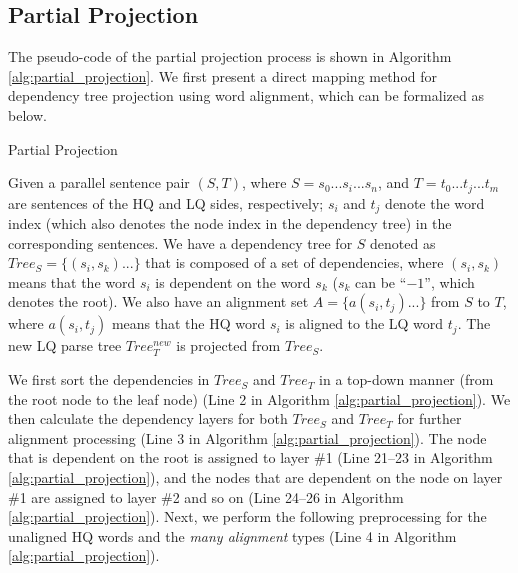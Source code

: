 \documentclass[english]{jnlp_1.4}
\newcommand{\MidSmall}{}
\begin{document}
\subsection{Partial Projection}
\label{sec:partial_projection}

The pseudo-code of the partial projection process is shown in Algorithm \ref{alg:partial_projection}.
We first present a direct mapping method for dependency tree projection using word alignment,
which can be formalized as below.

\SetAlFnt{\MidSmall}
\begin{algorithm}[p]

\caption{{Partial Projection}}\label{alg:partial_projection}
\end{algorithm}

Given a parallel sentence pair $(S,T)$, where {$S=s_0...s_i...s_n$}, and {$T=t_0...t_j...t_m$} are
sentences of the HQ and LQ sides, respectively; $s_i$ and $t_j$ denote the word index (which also denotes the
node index in the dependency tree) in the corresponding sentences. We have a dependency tree for $S$ denoted as 
$Tree_S=\{(s_i, s_k)...\}$ that is composed of a set of dependencies, where $(s_i, s_k)$ means that the
word $s_i$ is dependent on the word $s_k$ {($s_k$ can be ``$-1$'', which denotes the root)}. 
We also have an alignment set $A=\{a(s_i, t_j)...\}$ from $S$ to $T$, where
$a(s_i, t_j)$ means that the HQ word $s_i$ is aligned to the LQ word $t_j$. The new LQ parse tree
$Tree_T^{new}$ is projected from $Tree_S$. 

{We first sort the dependencies in $Tree_S$ and $Tree_T$ in a top-down manner (from the root node to the leaf node) (Line 2
in Algorithm \ref{alg:partial_projection}). We then calculate the dependency layers for both $Tree_S$ and $Tree_T$
for further alignment processing (Line 3 in Algorithm \ref{alg:partial_projection}). The node that 
is dependent on the root is assigned to layer \#1 (Line 21--23 in Algorithm \ref{alg:partial_projection}), and 
the nodes that are dependent on the node on layer \#1 are assigned to layer \#2 and so on (Line 24--26 in Algorithm 
\ref{alg:partial_projection}). Next, we} perform the following preprocessing for the unaligned
HQ words {and the {\it many alignment} types (Line {4} in Algorithm \ref{alg:partial_projection})}.
\end{document}
